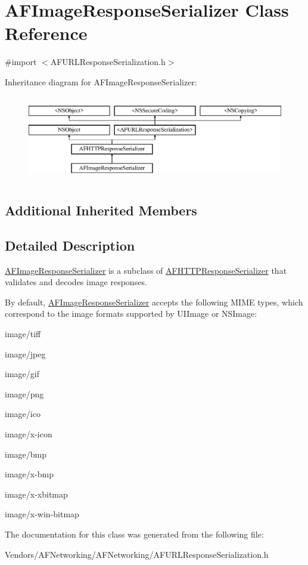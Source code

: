 \hypertarget{interface_a_f_image_response_serializer}{}\section{A\+F\+Image\+Response\+Serializer Class Reference}
\label{interface_a_f_image_response_serializer}


{\ttfamily \#import $<$A\+F\+U\+R\+L\+Response\+Serialization.\+h$>$}

Inheritance diagram for A\+F\+Image\+Response\+Serializer\+:\begin{figure}[H]
\begin{center}
\leavevmode
\includegraphics[height=3.771044cm]{interface_a_f_image_response_serializer}
\end{center}
\end{figure}
\subsection*{Additional Inherited Members}


\subsection{Detailed Description}
{\ttfamily \hyperlink{interface_a_f_image_response_serializer}{A\+F\+Image\+Response\+Serializer}} is a subclass of {\ttfamily \hyperlink{interface_a_f_h_t_t_p_response_serializer}{A\+F\+H\+T\+T\+P\+Response\+Serializer}} that validates and decodes image responses.

By default, {\ttfamily \hyperlink{interface_a_f_image_response_serializer}{A\+F\+Image\+Response\+Serializer}} accepts the following M\+I\+M\+E types, which correspond to the image formats supported by U\+I\+Image or N\+S\+Image\+:


\begin{DoxyItemize}
\item {\ttfamily image/tiff}
\item {\ttfamily image/jpeg}
\item {\ttfamily image/gif}
\item {\ttfamily image/png}
\item {\ttfamily image/ico}
\item {\ttfamily image/x-\/icon}
\item {\ttfamily image/bmp}
\item {\ttfamily image/x-\/bmp}
\item {\ttfamily image/x-\/xbitmap}
\item {\ttfamily image/x-\/win-\/bitmap} 
\end{DoxyItemize}

The documentation for this class was generated from the following file\+:\begin{DoxyCompactItemize}
\item 
Vendors/\+A\+F\+Networking/\+A\+F\+Networking/A\+F\+U\+R\+L\+Response\+Serialization.\+h\end{DoxyCompactItemize}
